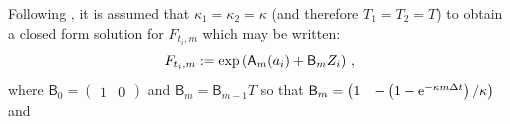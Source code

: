 \medskip

Following \cite{almansour:2016}, it is assumed that $\kappa_1 = \kappa_2 = \kappa$ (and therefore $T_1=T_2=T$) to obtain a closed form solution for $F_{t_i,m}$ which may be written:
\[
F_{t_i,m} := \exp\left( \mathsf{A}_{m}(a_{i}) + \mathsf{B}_{m} Z_{i}\right)\,,
\]
where $\mathsf{B}_0	= \begin{pmatrix}1 & 0 \end{pmatrix}$ and  $\mathsf{B}_m    = \mathsf{B}_{m-1} T$ so that  $ \mathsf{B}_m= \begin{pmatrix} 1 & -\left(1-\mathrm{e}^{-\kappa m \Delta t}\right)/\kappa \end{pmatrix}$ and
